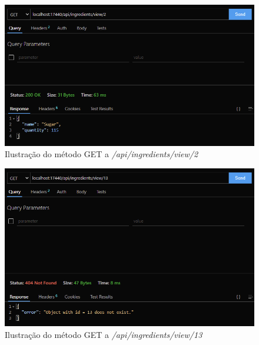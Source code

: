 \FloatBarrier
\begin{figure}[!hbt]
    \centering
    \includegraphics[width=14cm]{Resources/API/Ingredients/Ingredients (4).png}
    \caption{Ilustração do método GET a \textit{/api/ingredients/view/2}}
    
\end{figure}
\FloatBarrier
\begin{figure}[!hbt]
    \centering
    \includegraphics[width=14cm]{Resources/API/Ingredients/Ingredients (5).png}
    \caption{Ilustração do método GET a \textit{/api/ingredients/view/13}}
    
\end{figure}
\FloatBarrier

